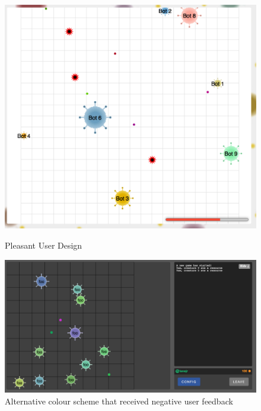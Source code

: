 \documentclass[a4paper, 6pt]{article}
\begin{document}
\begin{figure}[ht!]
\includegraphics[width=\linewidth]{game_03.png}
\caption{Pleasant User Design}
\endminipage\hfill
{}
\includegraphics[width=\linewidth]{game_dark.png}
\caption{Alternative colour scheme that received negative user feedback}
\endminipage\hfill
\end{figure}
\end{document}
